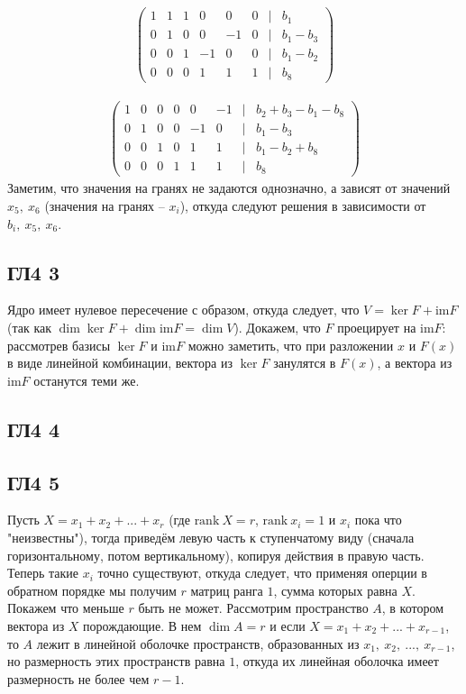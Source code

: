 		\begin{gather*}
			\begin{pmatrix}
				1 & 1 & 1 & 0  & 0  & 0 & | & b_1\\ 
				0 & 1 & 0 & 0  & -1 & 0 & | & b_1 - b_3\\
				0 & 0 & 1 & -1 & 0  & 0 & | & b_1 - b_2\\
				0 & 0 & 0 & 1  & 1  & 1 & | & b_8
			\end{pmatrix}
		\end{gather*}
		
		\begin{gather*}
			\begin{pmatrix}
				1 & 0 & 0 & 0 & 0  & -1 & | & b_2 + b_3 - b_1 - b_8\\ 
				0 & 1 & 0 & 0 & -1 &  0 & | & b_1 - b_3\\
				0 & 0 & 1 & 0 & 1  &  1 & | & b_1 - b_2 + b_8\\
				0 & 0 & 0 & 1 & 1  &  1 & | & b_8
			\end{pmatrix}
		\end{gather*}
		Заметим, что значения на гранях не задаются однозначно, а зависят от значений $x_5,\ x_6$ (значения на гранях -- $x_i$), откуда следуют решения в зависимости от $b_i,\ x_5,\ x_6$.
	
		\subsection{ГЛ4 3}
		Ядро имеет нулевое пересечение с образом, откуда следует, что $V = \ker F + \text{im} F$ (так как $\dim \ker F + \dim\text{im} F = \dim V$). Докажем, что $F$ проецирует на $\text{im} F$: рассмотрев базисы $\ker F$ и $\text{im} F$ можно заметить, что при разложении $x$ и $F(x)$ в виде линейной комбинации, вектора из $\ker F$ занулятся в $F(x)$, а вектора из $\text{im} F$ останутся теми же.
		
		\subsection{ГЛ4 4}
		
		\subsection{ГЛ4 5}
		Пусть $X = x_1 + x_2 + ... + x_r$ (где $\text{rank}\ X = r$, $\text{rank}\ x_i = 1$ и $x_i$ пока что "неизвестны"), тогда приведём левую часть к ступенчатому виду (сначала горизонтальному, потом вертикальному), копируя действия в правую часть. Теперь такие $x_i$ точно существуют, откуда следует, что применяя оперции в обратном порядке мы получим $r$ матриц ранга $1$, сумма которых равна $X$. Покажем что меньше $r$ быть не может. Рассмотрим пространство $A$, в котором вектора из $X$ порождающие. В нем $\dim A = r$ и если $X = x_1 + x_2 + ... + x_{r-1}$, то $A$ лежит в линейной оболочке пространств, образованных из $x_1,\ x_2,\ ... ,\ x_{r-1}$, но размерность этих пространств равна $1$, откуда их линейная оболочка имеет размерность не более чем $r-1$.
		
